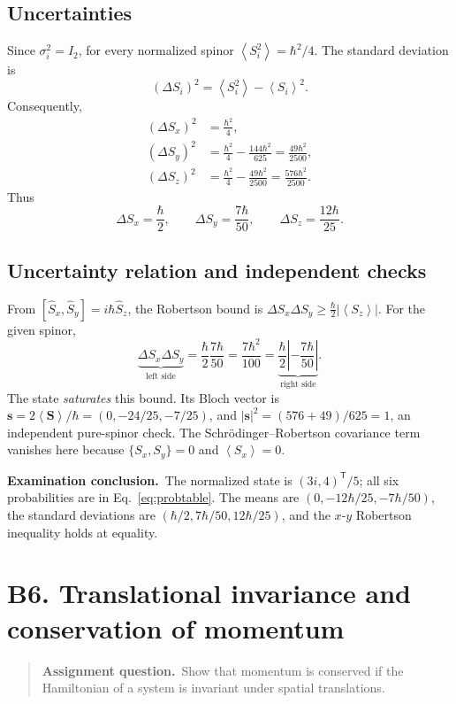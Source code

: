 \documentclass[11pt,a4paper]{article}
\theoremstyle{definition}
\newcommand{\avg}[1]{\left\langle #1\right\rangle}
\newenvironment{question}{\begin{quote}\small\noindent\textbf{Assignment question.}\ }{\end{quote}}
\newcommand{\exam}[1]{\par\medskip\noindent\textbf{Examination conclusion.}\ #1\par}
\begin{document}
\subsection{Uncertainties}
Since \(\sigma_i^2=I_2\), for every normalized spinor \(\avg{S_i^2}=\hbar^2/4\). The standard deviation is
\begin{equation}
(\Delta S_i)^2=\avg{S_i^2}-\avg{S_i}^2.
\end{equation}
Consequently,
\begin{align}
(\Delta S_x)^2&=\frac{\hbar^2}{4},\\
(\Delta S_y)^2&=\frac{\hbar^2}{4}-\frac{144\hbar^2}{625}=\frac{49\hbar^2}{2500},\\
(\Delta S_z)^2&=\frac{\hbar^2}{4}-\frac{49\hbar^2}{2500}=\frac{576\hbar^2}{2500}.
\end{align}
Thus
\begin{equation}
\boxed{\Delta S_x=\frac\hbar2,\qquad\Delta S_y=\frac{7\hbar}{50},\qquad\Delta S_z=\frac{12\hbar}{25}.}
\end{equation}
\subsection{Uncertainty relation and independent checks}
From \([\hat S_x,\hat S_y]=i\hbar\hat S_z\), the Robertson bound is \(\Delta S_x\Delta S_y\ge\frac\hbar2|\avg{S_z}|\). For the given spinor,
\begin{equation}
\underbrace{\Delta S_x\Delta S_y}_{\text{left side}}=\frac\hbar2\frac{7\hbar}{50}
=\frac{7\hbar^2}{100}
=\underbrace{\frac\hbar2\left|-\frac{7\hbar}{50}\right|}_{\text{right side}}.
\end{equation}
The state \emph{saturates} this bound. Its Bloch vector is \(\mathbf s=2\avg{\mathbf S}/\hbar=(0,-24/25,-7/25)\), and \(|\mathbf s|^2=(576+49)/625=1\), an independent pure-spinor check. The Schr\"odinger--Robertson covariance term vanishes here because \(\{S_x,S_y\}=0\) and \(\avg{S_x}=0\).
\exam{The normalized state is \((3i,4)^{\mathsf T}/5\); all six probabilities are in Eq.~\eqref{eq:probtable}. The means are \((0,-12\hbar/25,-7\hbar/50)\), the standard deviations are \((\hbar/2,7\hbar/50,12\hbar/25)\), and the \(x\)-\(y\) Robertson inequality holds at equality.}

\section{B6. Translational invariance and conservation of momentum}
\begin{question}Show that momentum is conserved if the Hamiltonian of a system is invariant under spatial translations.\end{question}
\end{document}

